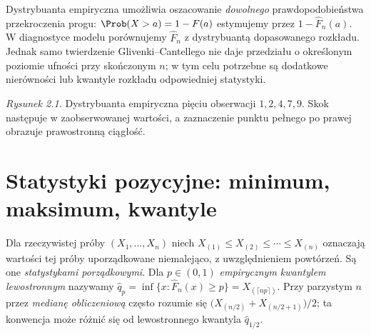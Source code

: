 \begin{uwaga}
Dystrybuanta empiryczna umożliwia oszacowanie \emph{dowolnego} prawdopodobieństwa przekroczenia progu: $\Prob(X>a)=1-F(a)$ estymujemy przez $1-\widehat F_n(a)$. W diagnostyce modelu porównujemy $\widehat F_n$ z dystrybuantą dopasowanego rozkładu. Jednak samo twierdzenie Glivenki--Cantellego nie daje przedziału o określonym poziomie ufności przy skończonym $n$; w tym celu potrzebne są dodatkowe nierówności lub kwantyle rozkładu odpowiedniej statystyki.
\end{uwaga}

\begin{center}
\end{center}
\noindent\emph{Rysunek 2.1.} Dystrybuanta empiryczna pięciu obserwacji $1,2,4,7,9$. Skok następuje w zaobserwowanej wartości, a zaznaczenie punktu pełnego po prawej obrazuje prawostronną ciągłość.

\section{Statystyki pozycyjne: minimum, maksimum, kwantyle}\label{sec:orderstats}
\begin{definicja}\label{def:order}
Dla rzeczywistej próby $(X_1,\ldots,X_n)$ niech $X_{(1)}\le X_{(2)}\le\cdots\le X_{(n)}$ oznaczają wartości tej próby uporządkowane niemalejąco, z uwzględnieniem powtórzeń. Są one \emph{statystykami porządkowymi}. Dla $p\in(0,1)$ \emph{empirycznym kwantylem lewostronnym} nazywamy $\widehat q_p=\inf\{x:\widehat F_n(x)\ge p\}=X_{(\lceil np\rceil)}$. Przy parzystym $n$ przez \emph{medianę obliczeniową} często rozumie się $\bigl(X_{(n/2)}+X_{(n/2+1)}\bigr)/2$; ta konwencja może różnić się od lewostronnego kwantyla $\widehat q_{1/2}$.
\end{definicja}

